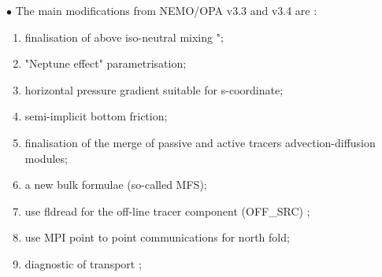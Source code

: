  \vspace{1cm}
$\bullet$ The main modifications from NEMO/OPA v3.3 and  v3.4 are :\\
\begin{enumerate}
\item finalisation of above iso-neutral mixing \citep{Griffies_al_JPO98}"; 
\item "Neptune effect" parametrisation;
\item horizontal pressure gradient suitable for s-coordinate; 
\item semi-implicit bottom friction;
\item finalisation of the merge of passive and active tracers advection-diffusion modules; 
\item a new bulk formulae (so-called MFS);
\item use fldread for the off-line tracer component (OFF\_SRC) ; 
\item use MPI point to point communications  for north fold;
\item diagnostic of transport ; 
\end{enumerate}



